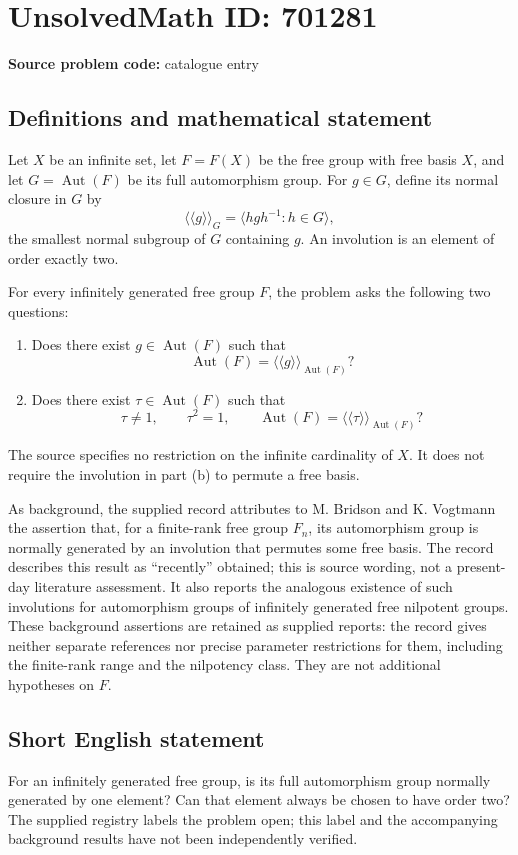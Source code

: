 \documentclass[11pt]{article}
\begin{document}
\section*{UnsolvedMath ID: 701281}
\textbf{Source problem code:} catalogue entry
\subsection{Definitions and mathematical statement}
Let \(X\) be an infinite set, let \(F=F(X)\) be the free group with free basis \(X\), and let \(G=\operatorname{Aut}(F)\) be its full automorphism group. For \(g\in G\), define its normal closure in \(G\) by
\[
\langle\!\langle g\rangle\!\rangle_G
=\bigl\langle hgh^{-1}:h\in G\bigr\rangle,
\]
the smallest normal subgroup of \(G\) containing \(g\). An involution is an element of order exactly two.

For every infinitely generated free group \(F\), the problem asks the following two questions:
\begin{enumerate}
\item[(a)] Does there exist \(g\in\operatorname{Aut}(F)\) such that
\[
\operatorname{Aut}(F)=\langle\!\langle g\rangle\!\rangle_{\operatorname{Aut}(F)}?
\]
\item[(b)] Does there exist \(\tau\in\operatorname{Aut}(F)\) such that
\[
\tau\ne 1,\qquad \tau^2=1,\qquad
\operatorname{Aut}(F)=\langle\!\langle\tau\rangle\!\rangle_{\operatorname{Aut}(F)}?
\]
\end{enumerate}
The source specifies no restriction on the infinite cardinality of \(X\). It does not require the involution in part (b) to permute a free basis.

As background, the supplied record attributes to M. Bridson and K. Vogtmann the assertion that, for a finite-rank free group \(F_n\), its automorphism group is normally generated by an involution that permutes some free basis. The record describes this result as ``recently'' obtained; this is source wording, not a present-day literature assessment. It also reports the analogous existence of such involutions for automorphism groups of infinitely generated free nilpotent groups. These background assertions are retained as supplied reports: the record gives neither separate references nor precise parameter restrictions for them, including the finite-rank range and the nilpotency class. They are not additional hypotheses on \(F\).
\subsection{Short English statement}
For an infinitely generated free group, is its full automorphism group normally generated by one element? Can that element always be chosen to have order two? The supplied registry labels the problem open; this label and the accompanying background results have not been independently verified.
\end{document}
